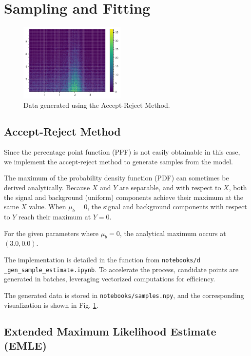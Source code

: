 \documentclass{article}
\begin{document}
\section{Sampling and Fitting}

\begin{figure}[!htbp]
\centering
\includegraphics[width=0.47\textwidth]{./images/accept_reject_sampling.pdf}
\caption{Data generated using the Accept-Reject Method.}
\label{fig:gd}
\end{figure}

\subsection{Accept-Reject Method}

Since the percentage point function (PPF) is not easily obtainable in this case, we implement the accept-reject method to generate samples from the model.

The maximum of the probability density function (PDF) can sometimes be derived analytically. Because $X$ and $Y$ are separable, and with respect to $X$, both the signal and background (uniform) components achieve their maximum at the same $X$ value. When $\mu_b = 0$, the signal and background components with respect to $Y$ reach their maximum at $Y = 0$.

For the given parameters where $\mu_b = 0$, the analytical maximum occurs at $(3.0, 0.0)$.

The implementation is detailed in the function  from \texttt{notebooks/d} \texttt{\_gen\_sample\_estimate.ipynb}. To accelerate the process, candidate points are generated in batches, leveraging vectorized computations for efficiency.

The generated data is stored in \texttt{notebooks/samples.npy}, and the corresponding visualization is shown in Fig. \ref{fig:gd}.



\subsection{Extended Maximum Likelihood Estimate (EMLE)}
\end{document}
